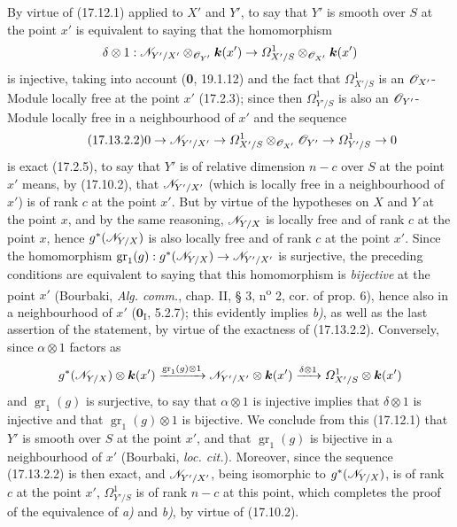 By virtue of (17.12.1) applied to $X'$ and $Y'$, to say that $Y'$ is smooth over $S$ at the point $x'$ is equivalent to saying that the homomorphism
\[
\delta\otimes1:\mathscr{N}_{Y'/X'}\otimes_{\mathscr{O}_{Y'}}\boldsymbol{k}(x')\to\varOmega^1_{X'/S}\otimes_{\mathscr{O}_{X'}}\boldsymbol{k}(x')
\]
is injective, taking into account (\textbf{0}, 19.1.12) and the fact that $\varOmega^1_{X'/S}$ is an $\mathscr{O}_{X'}$-Module locally free at the point $x'$ (17.2.3); since then $\varOmega^1_{Y'/S}$ is also an $\mathscr{O}_{Y'}$-Module locally free in a neighbourhood of $x'$ and the sequence
\[
\label{IV.17.13.2.2}
\tag{17.13.2.2}
0\to\mathscr{N}_{Y'/X'}\to\varOmega^1_{X'/S}\otimes_{\mathscr{O}_{X'}}\mathscr{O}_{Y'}\to\varOmega^1_{Y'/S}\to0
\]
is exact (17.2.5), to say that $Y'$ is of relative dimension $n-c$ over $S$ at the point $x'$ means, by (17.10.2), that $\mathscr{N}_{Y'/X'}$ (which is locally free in a neighbourhood of $x'$) is of rank $c$ at the point $x'$. But by virtue of the hypotheses on $X$ and $Y$ at the point $x$, and by the same reasoning, $\mathscr{N}_{Y/X}$ is locally free and of rank $c$ at the point $x$, hence $g^*(\mathscr{N}_{Y/X})$ is also locally free and of rank $c$ at the point $x'$. Since the homomorphism $\operatorname{gr}_1(g):g^*(\mathscr{N}_{Y/X})\to\mathscr{N}_{Y'/X'}$ is surjective, the preceding conditions are equivalent to saying that this homomorphism is
\emph{bijective} at the point $x'$ (Bourbaki, \emph{Alg. comm.}, chap. II, § 3, n\textsuperscript{o} 2, cor. of prop. 6), hence also in a neighbourhood of $x'$ ($\mathbf{0}_{\mathrm I}$, 5.2.7); this evidently implies \emph{b)}, as well as the last assertion of the statement, by virtue of the exactness of (17.13.2.2). Conversely, since $\alpha\otimes1$ factors as
\[
g^*(\mathscr{N}_{Y/X})\otimes\boldsymbol{k}(x')\xrightarrow{\operatorname{gr}_1(g)\otimes1}\mathscr{N}_{Y'/X'}\otimes\boldsymbol{k}(x')\xrightarrow{\delta\otimes1}\varOmega^1_{X'/S}\otimes\boldsymbol{k}(x')
\]
and $\operatorname{gr}_1(g)$ is surjective, to say that $\alpha\otimes1$ is injective implies that $\delta\otimes1$ is injective and that $\operatorname{gr}_1(g)\otimes1$ is bijective. We conclude from this (17.12.1) that $Y'$ is smooth over $S$ at the point $x'$, and that $\operatorname{gr}_1(g)$ is bijective in a neighbourhood of $x'$ (Bourbaki, \emph{loc. cit.}). Moreover, since the sequence (17.13.2.2) is then exact, and $\mathscr{N}_{Y'/X'}$, being isomorphic to $g^*(\mathscr{N}_{Y/X})$, is of rank $c$ at the point $x'$, $\varOmega^1_{Y'/S}$ is of rank $n-c$ at this point, which completes the proof of the equivalence of \emph{a)} and \emph{b)}, by virtue of (17.10.2).

